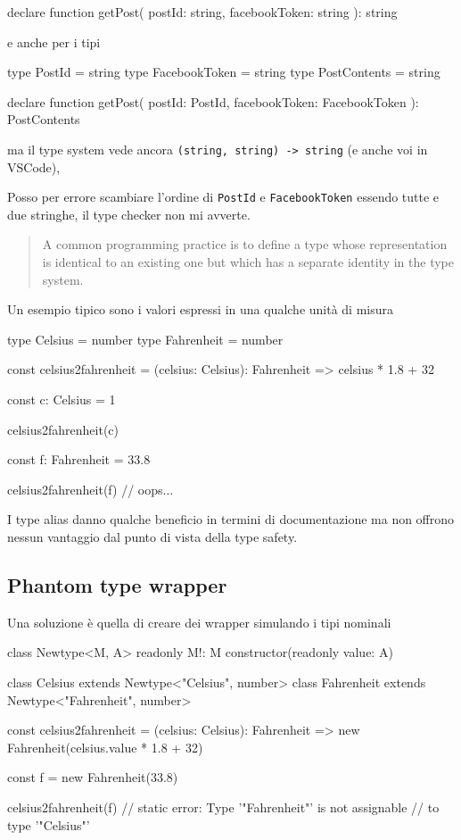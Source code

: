 \documentclass[12pt]{article}
\theoremstyle{definition}
\newenvironment{code}
  {\vspace{0.5cm} \VerbatimEnvironment\begin{typescriptcode}}
  {\end{typescriptcode} \vspace{0.2cm}}
\begin{document}
\begin{code}
declare function getPost(
  postId: string,
  facebookToken: string
): string
\end{code}

e anche per i tipi

\begin{code}
type PostId = string
type FacebookToken = string
type PostContents = string

declare function getPost(
  postId: PostId,
  facebookToken: FacebookToken
): PostContents
\end{code}

ma il type system vede ancora \texttt{(string, string) -> string} (e anche voi in VSCode),

Posso per errore scambiare l'ordine di \texttt{PostId} e \texttt{FacebookToken} essendo tutte e due stringhe, il type checker non mi avverte.

\begin{quote}
A common programming practice is to define a type whose representation is identical to an existing one but which
has a separate identity in the type system.
\end{quote}

Un esempio tipico sono i valori espressi in una qualche unità di misura

\begin{code}
type Celsius = number
type Fahrenheit = number

const celsius2fahrenheit = (celsius: Celsius): Fahrenheit =>
  celsius * 1.8 + 32

const c: Celsius = 1

celsius2fahrenheit(c)

const f: Fahrenheit = 33.8

celsius2fahrenheit(f) // oops...
\end{code}

I type alias danno qualche beneficio in termini di documentazione ma non offrono nessun vantaggio dal punto di vista della type safety.

\subsection{Phantom type wrapper}

Una soluzione è quella di creare dei wrapper simulando i tipi nominali

\begin{code}
class Newtype<M, A> {
  readonly M!: M
  constructor(readonly value: A) {}
}

class Celsius extends Newtype<"Celsius", number> {}
class Fahrenheit extends Newtype<"Fahrenheit", number> {}

const celsius2fahrenheit = (celsius: Celsius): Fahrenheit =>
  new Fahrenheit(celsius.value * 1.8 + 32)

const f = new Fahrenheit(33.8)

celsius2fahrenheit(f)
// static error: Type '"Fahrenheit"' is not assignable
// to type '"Celsius"'
\end{code}
\end{document}
